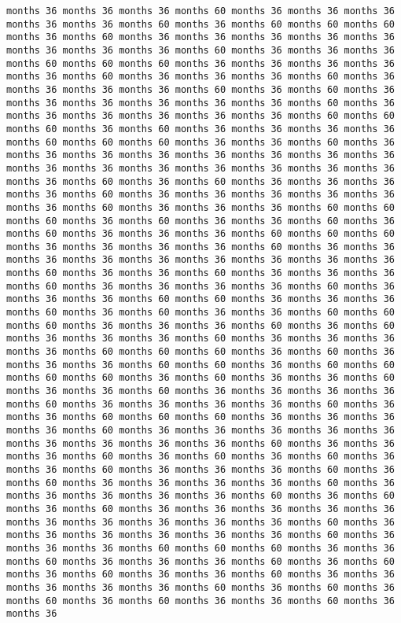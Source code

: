 \documentclass[11pt]{article}
\begin{document}
\begin{Verbatim}[commandchars=\\\{\}, frame=single, framerule=2mm, rulecolor=\color{outerrorbackground}]
months 36 months 36 months 36 months 60 months 36 months 36 months 36 months 36 months 36 months 60 months 36 months 60 months 60 months 60 months 36 months 60 months 36 months 36 months 36 months 36 months 36 months 36 months 36 months 36 months 60 months 36 months 36 months 36 months 60 months 60 months 60 months 36 months 36 months 36 months 36 months 36 months 60 months 36 months 36 months 36 months 60 months 36 months 36 months 36 months 36 months 60 months 36 months 60 months 36 months 36 months 36 months 36 months 36 months 36 months 60 months 36 months 36 months 36 months 36 months 36 months 36 months 60 months 60 months 60 months 36 months 60 months 36 months 36 months 36 months 36 months 60 months 60 months 60 months 36 months 36 months 60 months 36 months 36 months 36 months 36 months 36 months 36 months 36 months 36 months 36 months 36 months 36 months 36 months 36 months 36 months 36 months 36 months 60 months 36 months 60 months 36 months 36 months 36 months 36 months 60 months 36 months 36 months 36 months 36 months 36 months 36 months 60 months 36 months 36 months 36 months 60 months 60 months 60 months 36 months 60 months 36 months 36 months 60 months 36 months 60 months 36 months 36 months 36 months 60 months 60 months 60 months 36 months 36 months 36 months 36 months 60 months 36 months 36 months 36 months 36 months 36 months 36 months 36 months 36 months 36 months 60 months 36 months 36 months 60 months 36 months 36 months 36 months 60 months 36 months 36 months 36 months 36 months 60 months 36 months 36 months 36 months 60 months 60 months 36 months 36 months 36 months 60 months 36 months 60 months 36 months 36 months 60 months 60 months 60 months 36 months 36 months 36 months 60 months 36 months 60 months 36 months 36 months 36 months 60 months 36 months 36 months 36 months 36 months 60 months 60 months 60 months 36 months 60 months 36 months 36 months 36 months 60 months 60 months 36 months 60 months 60 months 60 months 60 months 36 months 60 months 36 months 36 months 60 months 36 months 36 months 60 months 36 months 36 months 36 months 36 months 60 months 36 months 36 months 36 months 36 months 60 months 36 months 36 months 60 months 60 months 60 months 36 months 36 months 36 months 36 months 60 months 36 months 36 months 36 months 36 months 36 months 36 months 36 months 36 months 36 months 60 months 36 months 36 months 36 months 60 months 36 months 60 months 36 months 60 months 36 months 36 months 60 months 36 months 36 months 36 months 60 months 36 months 60 months 36 months 36 months 36 months 36 months 60 months 36 months 36 months 36 months 36 months 36 months 60 months 36 months 60 months 36 months 60 months 36 months 36 months 36 months 36 months 36 months 36 months 36 months 36 months 36 months 36 months 60 months 36 months 36 months 36 months 36 months 36 months 36 months 60 months 36 months 36 months 36 months 60 months 60 months 60 months 36 months 36 months 60 months 36 months 36 months 36 months 60 months 36 months 60 months 36 months 60 months 36 months 36 months 60 months 36 months 36 months 36 months 36 months 36 months 60 months 36 months 60 months 36 months 60 months 36 months 60 months 36 months 36 months 60 months 36 months 36 
\end{Verbatim}
\end{document}
